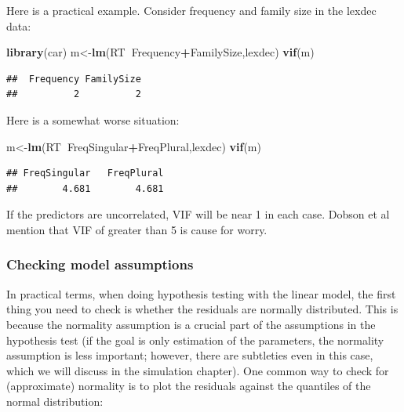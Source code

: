 \documentclass[12pt,]{krantz}
\newenvironment{Shaded}{\begin{snugshade}}{\end{snugshade}}
\newcommand{\KeywordTok}[1]{\textcolor[rgb]{0.13,0.29,0.53}{\textbf{#1}}}
\newcommand{\NormalTok}[1]{#1}
\newcommand{\OperatorTok}[1]{\textcolor[rgb]{0.81,0.36,0.00}{\textbf{#1}}}
\begin{document}
Here is a practical example.
Consider frequency and family size in the lexdec data:

\begin{Shaded}
\begin{Highlighting}[]
\KeywordTok{library}\NormalTok{(car)}
\NormalTok{m<-}\KeywordTok{lm}\NormalTok{(RT}\OperatorTok{~}\NormalTok{Frequency}\OperatorTok{+}\NormalTok{FamilySize,lexdec)}
\KeywordTok{vif}\NormalTok{(m)}
\end{Highlighting}
\end{Shaded}

\begin{verbatim}
##  Frequency FamilySize 
##          2          2
\end{verbatim}

Here is a somewhat worse situation:

\begin{Shaded}
\begin{Highlighting}[]
\NormalTok{m<-}\KeywordTok{lm}\NormalTok{(RT}\OperatorTok{~}\NormalTok{FreqSingular}\OperatorTok{+}\NormalTok{FreqPlural,lexdec)}
\KeywordTok{vif}\NormalTok{(m)}
\end{Highlighting}
\end{Shaded}

\begin{verbatim}
## FreqSingular   FreqPlural 
##        4.681        4.681
\end{verbatim}

If the predictors are uncorrelated, VIF will be near 1 in each case. Dobson et al mention that VIF of greater than 5 is cause for worry.

\hypertarget{checking-model-assumptions-1}{%
\subsubsection{Checking model assumptions}\label{checking-model-assumptions-1}}

In practical terms, when doing hypothesis testing with the linear model, the first thing you need to check is whether
the residuals are normally distributed. This is because the normality assumption is a crucial part of the assumptions in the hypothesis test (if the goal is only estimation of the parameters, the normality assumption is less important; however, there are subtleties even in this case, which we will discuss in the simulation chapter).
One common way to check for (approximate) normality is to plot the residuals against the quantiles of the normal distribution:
\end{document}
